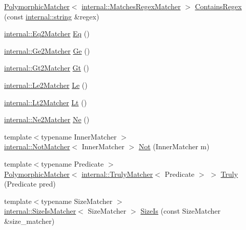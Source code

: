 \begin{DoxyCompactItemize}
\item 
\hyperlink{classtesting_1_1PolymorphicMatcher}{Polymorphic\+Matcher}$<$ \hyperlink{classtesting_1_1internal_1_1MatchesRegexMatcher}{internal\+::\+Matches\+Regex\+Matcher} $>$ \hyperlink{namespacetesting_ad8efafa15630a8274f41f5e22f8f0e49}{Contains\+Regex} (const \hyperlink{namespacetesting_1_1internal_a8e8ff5b11e64078831112677156cb111}{internal\+::string} \&regex)
\item 
\hyperlink{classtesting_1_1internal_1_1Eq2Matcher}{internal\+::\+Eq2\+Matcher} \hyperlink{namespacetesting_aa7771a34f092fd6f1dca2c82fb2a36a1}{Eq} ()
\item 
\hyperlink{classtesting_1_1internal_1_1Ge2Matcher}{internal\+::\+Ge2\+Matcher} \hyperlink{namespacetesting_a8cc0a6519e30bedf52c6e53c71e18265}{Ge} ()
\item 
\hyperlink{classtesting_1_1internal_1_1Gt2Matcher}{internal\+::\+Gt2\+Matcher} \hyperlink{namespacetesting_a3eaae6408f77ba7d87ca2d6a21dbde77}{Gt} ()
\item 
\hyperlink{classtesting_1_1internal_1_1Le2Matcher}{internal\+::\+Le2\+Matcher} \hyperlink{namespacetesting_a04def1c627ea7e3fce2f08cb06e83ebc}{Le} ()
\item 
\hyperlink{classtesting_1_1internal_1_1Lt2Matcher}{internal\+::\+Lt2\+Matcher} \hyperlink{namespacetesting_a3b4d6d29d715c1bf219163f5206b53d4}{Lt} ()
\item 
\hyperlink{classtesting_1_1internal_1_1Ne2Matcher}{internal\+::\+Ne2\+Matcher} \hyperlink{namespacetesting_a0cde8994764617eebc751e682c28d4ae}{Ne} ()
\item 
{\footnotesize template$<$typename Inner\+Matcher $>$ }\\\hyperlink{classtesting_1_1internal_1_1NotMatcher}{internal\+::\+Not\+Matcher}$<$ Inner\+Matcher $>$ \hyperlink{namespacetesting_a3d7d0dda7e51b13fe2f5aa28e23ed6b6}{Not} (Inner\+Matcher m)
\item 
{\footnotesize template$<$typename Predicate $>$ }\\\hyperlink{classtesting_1_1PolymorphicMatcher}{Polymorphic\+Matcher}$<$ \hyperlink{classtesting_1_1internal_1_1TrulyMatcher}{internal\+::\+Truly\+Matcher}$<$ Predicate $>$ $>$ \hyperlink{namespacetesting_a5faf05cfaae6074439960048e478b1c8}{Truly} (Predicate pred)
\item 
{\footnotesize template$<$typename Size\+Matcher $>$ }\\\hyperlink{classtesting_1_1internal_1_1SizeIsMatcher}{internal\+::\+Size\+Is\+Matcher}$<$ Size\+Matcher $>$ \hyperlink{namespacetesting_acd5e215558f95f1393c048a6d496060d}{Size\+Is} (const Size\+Matcher \&size\+\_\+matcher)

\end{DoxyCompactItemize}
